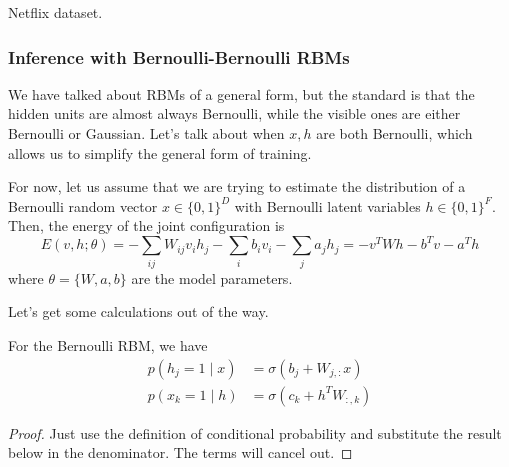 \documentclass{article}
\begin{document}
    \begin{example}
      Netflix dataset. 
    \end{example}

  \subsubsection{Inference with Bernoulli-Bernoulli RBMs}

    We have talked about RBMs of a general form, but the standard is that the hidden units are almost always Bernoulli, while the visible ones are either Bernoulli or Gaussian. Let's talk about when $x, h$ are both Bernoulli, which allows us to simplify the general form of training. 

    \begin{definition}
      For now, let us assume that we are trying to estimate the distribution of a Bernoulli random vector $x \in \{0, 1\}^D$ with Bernoulli latent variables $h \in \{0, 1\}^F$. Then, the energy of the joint configuration is  
      \begin{equation}
        E(v, h; \theta) = - \sum_{ij} W_{ij} v_i h_j - \sum_i b_i v_i - \sum_j a_j h_j = - v^T W h - b^T v - a^T h
      \end{equation}
      where $\theta = \{W, a, b\}$ are the model parameters. 
    \end{definition}

    Let's get some calculations out of the way. 

    \begin{lemma} 
      For the Bernoulli RBM, we have 
      \begin{align} 
        p(h_j = 1 \mid x) & = \sigma ( b_j + W_{j,:} x) \\
        p(x_k = 1 \mid h) & = \sigma ( c_k + h^T W_{:, k})
      \end{align}
    \end{lemma}
    \begin{proof}
      Just use the definition of conditional probability and substitute the result below in the denominator. The terms will cancel out. 
    \end{proof}
\end{document}
